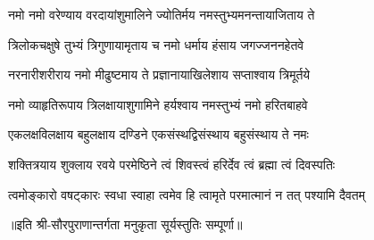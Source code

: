 

\twolineshloka
{नमो नमो वरेण्याय वरदायांशुमालिने}
{ज्योतिर्मय नमस्तुभ्यमनन्तायाजिताय ते}

\twolineshloka
{त्रिलोकचक्षुषे तुभ्यं त्रिगुणायामृताय च}
{नमो धर्माय हंसाय जगज्जननहेतवे}

\twolineshloka
{नरनारीशरीराय नमो मीढुष्टमाय ते}
{प्रज्ञानायाखिलेशाय सप्ताश्वाय त्रिमूर्तये}

\twolineshloka
{नमो व्याहृतिरूपाय त्रिलक्षायाशुगामिने}
{हर्यश्वाय नमस्तुभ्यं नमो हरितबाहवे}

\twolineshloka
{एकलक्षविलक्षाय बहुलक्षाय दण्डिने}
{एकसंस्थद्विसंस्थाय बहुसंस्थाय ते नमः}

\twolineshloka
{शक्तित्रयाय शुक्लाय रवये परमेष्ठिने}
{त्वं शिवस्त्वं हरिर्देव त्वं ब्रह्मा त्वं दिवस्पतिः}

\twolineshloka
{त्वमोङ्कारो वषट्कारः स्वधा स्वाहा त्वमेव हि}
{त्वामृते परमात्मानं न तत् पश्यामि दैवतम्}


॥इति श्री-सौरपुराणान्तर्गता मनुकृता सूर्यस्तुतिः सम्पूर्णा॥